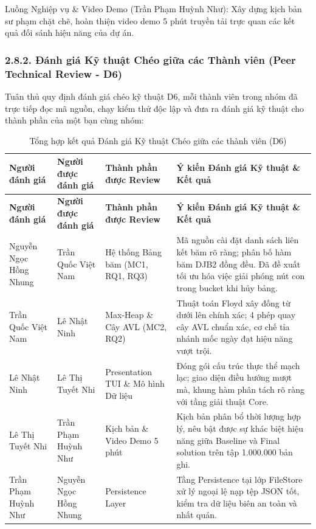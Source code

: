 \documentclass[14pt,a4paper]{extarticle}
\begin{document}
Luồng Nghiệp vụ \& Video Demo (Trần Phạm Huỳnh Như): Xây dựng kịch bản sư phạm chặt chẽ, hoàn thiện video demo 5 phút truyền tải trực quan các kết quả đối sánh hiệu năng của dự án.

\subsubsection*{2.8.2. Đánh giá Kỹ thuật Chéo giữa các Thành viên (Peer Technical Review - D6)}

Tuân thủ quy định đánh giá chéo kỹ thuật D6, mỗi thành viên trong nhóm đã trực tiếp đọc mã nguồn, chạy kiểm thử độc lập và đưa ra đánh giá kỹ thuật cho thành phần của một bạn cùng nhóm:

\begingroup
{}
\setlength{\tabcolsep}{4pt}
\renewcommand{\arraystretch}{1.1}
\begin{xltabular}{\linewidth}{|>{\raggedright\arraybackslash}m{2.3cm}|>{\raggedright\arraybackslash}m{2.4cm}|>{\raggedright\arraybackslash}m{2.8cm}|>{\raggedright\arraybackslash}X|}
\caption{Tổng hợp kết quả Đánh giá Kỹ thuật Chéo giữa các thành viên (D6)}\label{tab:peer_review_d6} \\
\hline
\textbf{Người đánh giá} & \textbf{Người được đánh giá} & \textbf{Thành phần được Review} & \textbf{Ý kiến Đánh giá Kỹ thuật \& Kết quả} \\ \hline
\endfirsthead

\hline
\textbf{Người đánh giá} & \textbf{Người được đánh giá} & \textbf{Thành phần được Review} & \textbf{Ý kiến Đánh giá Kỹ thuật \& Kết quả} \\ \hline
\endhead

\hline
\endfoot

Nguyễn Ngọc Hồng Nhung & Trần Quốc Việt Nam & Hệ thống Bảng băm (MC1, RQ1, RQ3) & Mã nguồn cài đặt danh sách liên kết băm rõ ràng; phân bố hàm băm DJB2 đồng đều. Đã đề xuất tối ưu hóa việc giải phóng nút con trong bucket khi hủy bảng. \\ \hline
Trần Quốc Việt Nam & Lê Nhật Ninh & Max-Heap \& Cây AVL (MC2, RQ2) & Thuật toán Floyd xây đống từ dưới lên chính xác; 4 phép quay cây AVL chuẩn xác, cơ chế tỉa nhánh mốc ngày đạt hiệu năng vượt trội. \\ \hline
Lê Nhật Ninh & Lê Thị Tuyết Nhi & Presentation TUI \& Mô hình Dữ liệu & Đóng gói cấu trúc thực thể mạch lạc; giao diện điều hướng mượt mà, khung hàm phân tách rõ ràng với tầng giải thuật Core. \\ \hline
Lê Thị Tuyết Nhi & Trần Phạm Huỳnh Như & Kịch bản \& Video Demo 5 phút & Kịch bản phân bổ thời lượng hợp lý, nêu bật được sự khác biệt hiệu năng giữa Baseline và Final solution trên tập 1.000.000 bản ghi. \\ \hline
Trần Phạm Huỳnh Như & Nguyễn Ngọc Hồng Nhung & Persistence Layer & Tầng Persistence tại lớp FileStore xử lý ngoại lệ nạp tệp JSON tốt, kiểm tra dữ liệu biên an toàn và nhất quán. \\ \hline
\end{xltabular}
\endgroup
\end{document}
